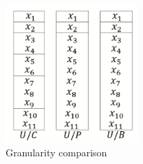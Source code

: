\documentclass[review]{elsarticle}
\begin{document}
		\begin{figure}[ht]
			\centering
			\includegraphics[width=5cm]{./12.jpg} 
			\caption{Granularity comparison}
			\label{GSComparison}
		\end{figure}
\end{document}
